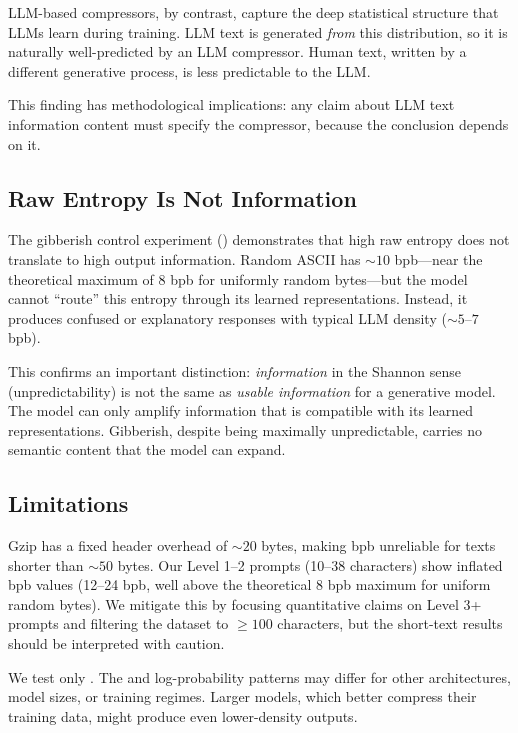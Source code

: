 LLM-based compressors, by contrast, capture the deep statistical structure that LLMs learn during training. LLM text is generated \emph{from} this distribution, so it is naturally well-predicted by an LLM compressor. Human text, written by a different generative process, is less predictable to the LLM.

This finding has methodological implications: any claim about LLM text information content must specify the compressor, because the conclusion depends on it.

\subsection{Raw Entropy Is Not Information}
\label{sec:entropy}

The gibberish control experiment () demonstrates that high raw entropy does not translate to high output information. Random ASCII has ${\sim}10$ bpb---near the theoretical maximum of 8 bpb for uniformly random bytes---but the model cannot ``route'' this entropy through its learned representations. Instead, it produces confused or explanatory responses with typical LLM density (${\sim}5$--$7$ bpb).

This confirms an important distinction: \emph{information} in the Shannon sense (unpredictability) is not the same as \emph{usable information} for a generative model. The model can only amplify information that is compatible with its learned representations. Gibberish, despite being maximally unpredictable, carries no semantic content that the model can expand.

\subsection{Limitations}
\label{sec:limitations}

Gzip has a fixed header overhead of ${\sim}20$ bytes, making bpb unreliable for texts shorter than ${\sim}50$ bytes. Our Level 1--2 prompts (10--38 characters) show inflated bpb values (12--24 bpb, well above the theoretical 8 bpb maximum for uniform random bytes). We mitigate this by focusing quantitative claims on Level 3+ prompts and filtering the \gptwiki dataset to $\geq 100$ characters, but the short-text results should be interpreted with caution.

We test only \gptmini. The \densityratio and log-probability patterns may differ for other architectures, model sizes, or training regimes. Larger models, which better compress their training data, might produce even lower-density outputs.

